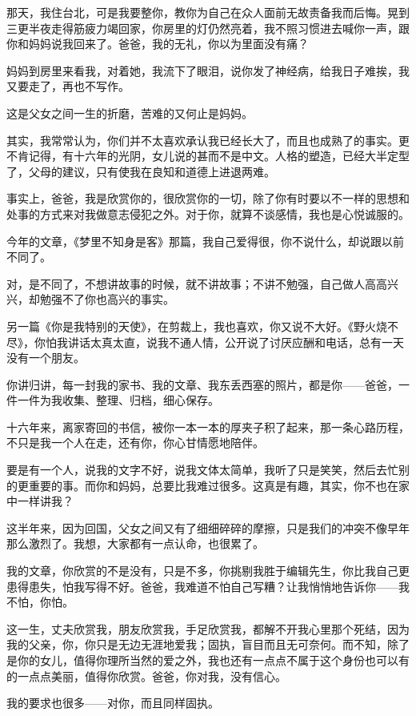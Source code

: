 \par 那天，我住台北，可是我要整你，教你为自己在众人面前无故责备我而后悔。晃到三更半夜走得筋疲力竭回家，你房里的灯仍然亮着，我不照习惯进去喊你一声，跟你和妈妈说我回来了。爸爸，我的无礼，你以为里面没有痛？
\par 妈妈到房里来看我，对着她，我流下了眼泪，说你发了神经病，给我日子难挨，我又要走了，再也不写作。
\par 这是父女之间一生的折磨，苦难的又何止是妈妈。
\par 其实，我常常认为，你们并不太喜欢承认我已经长大了，而且也成熟了的事实。更不肯记得，有十六年的光阴，女儿说的甚而不是中文。人格的塑造，已经大半定型了，父母的建议，只有使我在良知和道德上进退两难。
\par 事实上，爸爸，我是欣赏你的，很欣赏你的一切，除了你有时要以不一样的思想和处事的方式来对我做意志侵犯之外。对于你，就算不谈感情，我也是心悦诚服的。
\par 今年的文章，《梦里不知身是客》那篇，我自己爱得很，你不说什么，却说跟以前不同了。
\par 对，是不同了，不想讲故事的时候，就不讲故事；不讲不勉强，自己做人高高兴兴，却勉强不了你也高兴的事实。
\par 另一篇《你是我特别的天使》，在剪裁上，我也喜欢，你又说不大好。《野火烧不尽》，你怕我讲话太真太直，说我不通人情，公开说了讨厌应酬和电话，总有一天没有一个朋友。
\par 你讲归讲，每一封我的家书、我的文章、我东丢西塞的照片，都是你——爸爸，一件一件为我收集、整理、归档，细心保存。
\par 十六年来，离家寄回的书信，被你一本一本的厚夹子积了起来，那一条心路历程，不只是我一个人在走，还有你，你心甘情愿地陪伴。
\par 要是有一个人，说我的文字不好，说我文体太简单，我听了只是笑笑，然后去忙别的更重要的事。而你和妈妈，总要比我难过很多。这真是有趣，其实，你不也在家中一样讲我？
\par 这半年来，因为回国，父女之间又有了细细碎碎的摩擦，只是我们的冲突不像早年那么激烈了。我想，大家都有一点认命，也很累了。
\par 我的文章，你欣赏的不是没有，只是不多，你挑剔我胜于编辑先生，你比我自己更患得患失，怕我写得不好。爸爸，我难道不怕自己写糟？让我悄悄地告诉你——我不怕，你怕。
\par 这一生，丈夫欣赏我，朋友欣赏我，手足欣赏我，都解不开我心里那个死结，因为我的父亲，你，你只是无边无涯地爱我；固执，盲目而且无可奈何。而不知，除了是你的女儿，值得你理所当然的爱之外，我也还有一点点不属于这个身份也可以有的一点点美丽，值得你欣赏。爸爸，你对我，没有信心。
\par 我的要求也很多——对你，而且同样固执。
